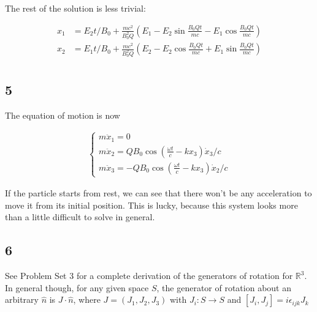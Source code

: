 \documentclass[12pt]{article}
\begin{document}
The rest of the solution is less trivial:

\begin{align*}
x_1 &= E_2t/B_0 + \frac{mc^2}{B_0^2Q} \left( E_1  - E_2\sin\frac{B_0Qt}{mc} - E_1\cos\frac{B_0Qt}{mc}\right)\\
x_2 &= E_1t/B_0 + \frac{mc^2}{B_0^2Q} \left( E_2  - E_2\cos\frac{B_0Qt}{mc} + E_1\sin\frac{B_0Qt}{mc}\right)\\
\end{align*}

\subsection*{5}

The equation of motion is now

\begin{align*}
\begin{cases}
m\ddot{x}_1 = 0 \\
m\ddot{x}_2 =  QB_0\cos(\frac{\omega t}{c}-kx_3)\dot{x}_3/c \\
m\ddot{x}_3 =  -QB_0\cos(\frac{\omega t}{c}-kx_3)\dot{x}_2/c
\end{cases}
\end{align*}

If the particle starts from rest, we can see that there won't be any acceleration to move it from its initial position. This is lucky, because this system looks more than a little difficult to solve in general.


\subsection*{6}

See Problem Set 3 for a complete derivation of the generators of rotation for \(\mathbb{R}^3\). In general though, for any given space \(S\), the generator of rotation about an arbitrary \(\hat{n}\) is \(J \cdot \hat{n}\), where \(J = (J_1,J_2,J_3)\)  with \(J_i:S \rightarrow S\) and \([J_i,J_j]=i\epsilon_{ijk}J_k\) 
\end{document}
